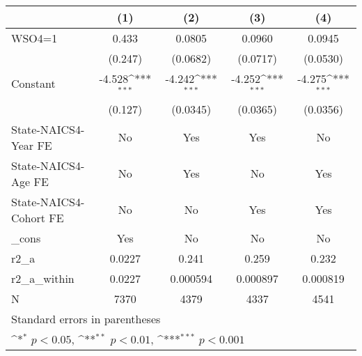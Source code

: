 {
\def\sym#1{\ifmmode^{#1}\else\(^{#1}\)\fi}
\begin{tabular}{l*{4}{c}}
\hline\hline
                    &\multicolumn{1}{c}{(1)}         &\multicolumn{1}{c}{(2)}         &\multicolumn{1}{c}{(3)}         &\multicolumn{1}{c}{(4)}         \\
\hline
WSO4=1              &       0.433         &      0.0805         &      0.0960         &      0.0945         \\
                    &     (0.247)         &    (0.0682)         &    (0.0717)         &    (0.0530)         \\
[1em]
Constant            &      -4.528\sym{***}&      -4.242\sym{***}&      -4.252\sym{***}&      -4.275\sym{***}\\
                    &     (0.127)         &    (0.0345)         &    (0.0365)         &    (0.0356)         \\
[1em]
State-NAICS4-Year FE&          No         &         Yes         &         Yes         &          No         \\
[1em]
State-NAICS4-Age FE &          No         &         Yes         &          No         &         Yes         \\
[1em]
State-NAICS4-Cohort FE&          No         &          No         &         Yes         &         Yes         \\
[1em]
\_cons              &         Yes         &          No         &          No         &          No         \\
\hline
r2\_a                &      0.0227         &       0.241         &       0.259         &       0.232         \\
r2\_a\_within         &      0.0227         &    0.000594         &    0.000897         &    0.000819         \\
N                   &        7370         &        4379         &        4337         &        4541         \\
\hline\hline
\multicolumn{5}{l}{\footnotesize Standard errors in parentheses}\\
\multicolumn{5}{l}{\footnotesize \sym{*} \(p<0.05\), \sym{**} \(p<0.01\), \sym{***} \(p<0.001\)}\\
\end{tabular}
}
